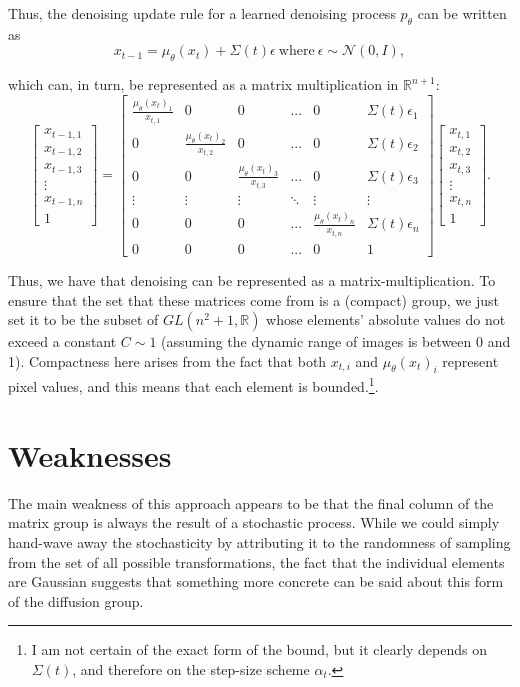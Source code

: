 \documentclass[10pt]{article} %
\begin{document}
Thus, the denoising update rule for a learned denoising process $p_\theta$ can be written as 
\[ 
  x_{t-1} = \mu_\theta(x_t) + \Sigma(t) \epsilon ~\text{where}~\epsilon \sim \mathcal{N}(0, I)
,\]

which can, in turn, be represented as a matrix multiplication in $\mathbb{R}^{n+1}$:
\[ 
\begin{bmatrix}
  x_{t-1,1} \\ 
  x_{t-1,2} \\ 
  x_{t-1,3} \\ 
  \vdots \\ 
  x_{t-1,n} \\ 
  1 
\end{bmatrix} = 
\begin{bmatrix}
  \frac{\mu_\theta(x_t)_1}{x_{t, 1}} & 0 & 0 & ... & 0 & \Sigma(t)\epsilon_1 \\
  0 & \frac{\mu_\theta(x_t)_2}{x_{t, 2}} & 0 & ... & 0 & \Sigma(t)\epsilon_2 \\ 
  0 & 0 & \frac{\mu_\theta(x_t)_3}{x_{t, 3}} & ... & 0 & \Sigma(t)\epsilon_3 \\ 
  \vdots & \vdots & \vdots & \ddots & \vdots & \vdots \\ 
  0 & 0 & 0 & ... & \frac{\mu_\theta(x_t)_n}{x_{t, n}} & \Sigma(t)\epsilon_n \\ 
  0 & 0 & 0 & ... & 0 & 1 
  \end{bmatrix}
\begin{bmatrix}
  x_{t,1} \\ 
  x_{t,2} \\ 
  x_{t,3} \\ 
  \vdots \\ 
  x_{t,n} \\ 
  1
\end{bmatrix}
.\]

Thus, we have that denoising can be represented as a matrix-multiplication. To ensure that the set that these matrices come from is a (compact) group, we just set it to be the subset of $GL(n^2 + 1, \mathbb{R})$ whose elements' absolute values do not exceed a constant $C \sim 1$ (assuming the dynamic range of images is between 0 and 1). Compactness here arises from the fact that both $x_{t, i}$ and $\mu_\theta(x_t)_i$ represent pixel values, and this means that each element is bounded.\footnote{I am not certain of the exact form of the bound, but it clearly depends on $\Sigma(t)$, and therefore on the step-size scheme ${\alpha_t}$.}.



\section{Weaknesses}
The main weakness of this approach appears to be that the final column of the matrix group is always the result of a stochastic process. While we could simply hand-wave away the stochasticity by attributing it to the randomness of sampling from the set of all possible transformations, the fact that the individual elements are Gaussian suggests that something more concrete can be said about this form of the diffusion group. 
\end{document}
